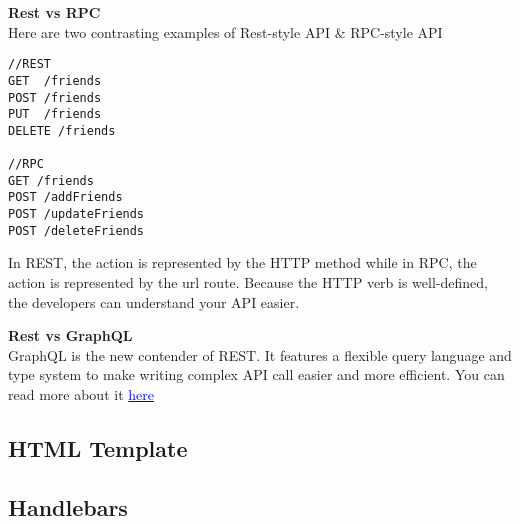 \documentclass[a4paper]{article}
\begin{document}
\textbf{Rest vs RPC}\\
Here are two contrasting examples of Rest-style API \& RPC-style API
\begin{lstlisting}
//REST
GET  /friends
POST /friends
PUT  /friends
DELETE /friends

//RPC
GET /friends
POST /addFriends
POST /updateFriends
POST /deleteFriends
\end{lstlisting}

In REST, the action is represented by the HTTP method while in RPC, the action is represented by the url route. Because the HTTP verb is well-defined, the developers can understand your API easier.

\textbf{Rest vs GraphQL}\\
GraphQL is the new contender of REST. It features a flexible query language and type system to make writing complex API call easier and more efficient. You can read more about it \href{http://graphql.org}{\textcolor{blue}{here}}

\subsection{HTML Template}
\subsection{Handlebars}
\end{document}
